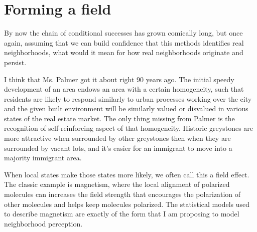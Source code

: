\documentclass{article}
\begin{document}
\section*{Forming a field}
By now the chain of conditional successes has grown comically long,
but once again, assuming that we can build confidence that this
methods identifies real neighborhoods, what would it mean for how
real neighborhoods originate and persist. 

I think that Ms. Palmer got it about right 90 years ago. The initial
speedy development of an area endows an area with a certain
homogeneity, such that residents are likely to respond similarly to
urban processes working over the city and the given built environment
will be similarly valued or disvalued in various states of the real
estate market. The only thing missing from Palmer is the recognition
of self-reinforcing aspect of that homogeneity. Historic greystones
are more attractive when surrounded by other greystones then when they
are surrounded by vacant lots, and it's easier for an immigrant to
move into a majority immigrant area. 

When local states make those states more likely, we often call this a
field effect. The classic example is magnetism, where the local
alignment of polarized molecules can increases the field strength that
encourages the polarization of other molecules and helps keep
molecules polarized. The statistical models used to describe magnetism
are exactly of the form that I am proposing to model neighborhood perception. 
\end{document}
